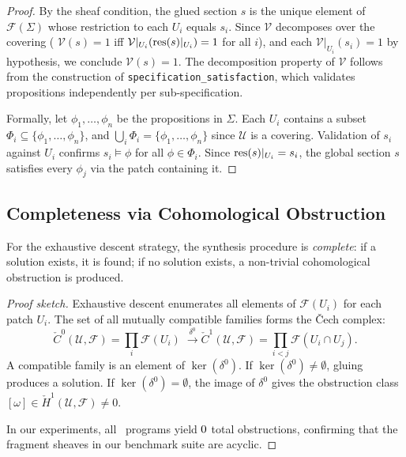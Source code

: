 \documentclass[11pt]{article}
\newcommand{\FragmentSpace}{\mathcal{F}}
\newcommand{\SpecSat}{\texttt{specification\_satisfaction}}
\begin{document}
\begin{proof}
By the sheaf condition, the glued section $s$ is the unique element
of $\FragmentSpace(\Sigma)$ whose restriction to each $U_i$ equals
$s_i$.  Since $\mathcal{V}$ decomposes over the covering (\ie
$\mathcal{V}(s) = 1$ iff $\mathcal{V}|_{U_i}(\mathrm{res}(s)|_{U_i}) = 1$
for all $i$), and each $\mathcal{V}|_{U_i}(s_i) = 1$ by hypothesis,
we conclude $\mathcal{V}(s) = 1$.  The decomposition property of
$\mathcal{V}$ follows from the construction of \SpecSat, which
validates propositions independently per sub-specification.

Formally, let $\phi_1, \ldots, \phi_n$ be the propositions in
$\Sigma$.  Each $U_i$ contains a subset $\Phi_i \subseteq
\{\phi_1, \ldots, \phi_n\}$, and $\bigcup_i \Phi_i =
\{\phi_1, \ldots, \phi_n\}$ since $\mathcal{U}$ is a covering.
Validation of $s_i$ against $U_i$ confirms $s_i \models \phi$ for
all $\phi \in \Phi_i$.  Since $\mathrm{res}(s)|_{U_i} = s_i$, the global
section $s$ satisfies every $\phi_j$ via the patch containing it.
\end{proof}

\subsection{Completeness via Cohomological Obstruction}

\begin{theorem}\label{thm:synth-complete}
For the exhaustive descent strategy, the synthesis procedure is
\emph{complete}: if a solution exists, it is found; if no solution
exists, a non-trivial cohomological obstruction is produced.
\end{theorem}

\begin{proof}[Proof sketch]
Exhaustive descent enumerates all elements of $\FragmentSpace(U_i)$
for each patch $U_i$.  The set of all mutually compatible families
forms the \v{C}ech complex:
\[
  \check{C}^0(\mathcal{U}, \FragmentSpace) =
  \prod_i \FragmentSpace(U_i)
  \;\xrightarrow{\;\delta^0\;}
  \check{C}^1(\mathcal{U}, \FragmentSpace) =
  \prod_{i < j} \FragmentSpace(U_i \cap U_j).
\]
A compatible family is an element of $\ker(\delta^0)$.  If
$\ker(\delta^0) \neq \emptyset$, gluing produces a solution.
If $\ker(\delta^0) = \emptyset$, the image of $\delta^0$ gives
the obstruction class $[\omega] \in \check{H}^1(\mathcal{U},
\FragmentSpace) \neq 0$.

In our experiments, all \ppLIVtotalPrograms\ programs yield
$0$ total obstructions, confirming that
the fragment sheaves in our benchmark suite are acyclic.
\end{proof}
\end{document}
